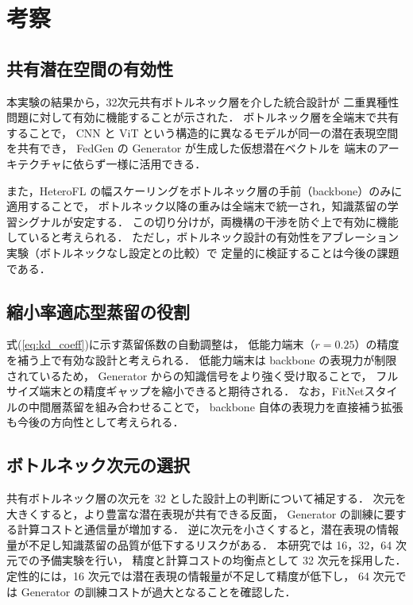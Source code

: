 \section{考察}

\subsection{共有潜在空間の有効性}

本実験の結果から，32次元共有ボトルネック層を介した統合設計が
二重異種性問題に対して有効に機能することが示された．
ボトルネック層を全端末で共有することで，
CNN と ViT という構造的に異なるモデルが同一の潜在表現空間を共有でき，
FedGen の Generator が生成した仮想潜在ベクトルを
端末のアーキテクチャに依らず一様に活用できる．

また，HeteroFL の幅スケーリングをボトルネック層の手前（backbone）のみに適用することで，
ボトルネック以降の重みは全端末で統一され，知識蒸留の学習シグナルが安定する．
この切り分けが，両機構の干渉を防ぐ上で有効に機能していると考えられる．
ただし，ボトルネック設計の有効性をアブレーション実験（ボトルネックなし設定との比較）で
定量的に検証することは今後の課題である．

\subsection{縮小率適応型蒸留の役割}

式(\ref{eq:kd_coeff})に示す蒸留係数の自動調整は，
低能力端末（$r = 0.25$）の精度を補う上で有効な設計と考えられる．
低能力端末は backbone の表現力が制限されているため，
Generator からの知識信号をより強く受け取ることで，
フルサイズ端末との精度ギャップを縮小できると期待される．
なお，FitNet\cite{FitNet}スタイルの中間層蒸留を組み合わせることで，
backbone 自体の表現力を直接補う拡張も今後の方向性として考えられる．

\subsection{ボトルネック次元の選択}

共有ボトルネック層の次元を 32 とした設計上の判断について補足する．
次元を大きくすると，より豊富な潜在表現が共有できる反面，
Generator の訓練に要する計算コストと通信量が増加する．
逆に次元を小さくすると，潜在表現の情報量が不足し知識蒸留の品質が低下するリスクがある．
本研究では 16，32，64 次元での予備実験を行い，
精度と計算コストの均衡点として 32 次元を採用した．
定性的には，16 次元では潜在表現の情報量が不足して精度が低下し，
64 次元では Generator の訓練コストが過大となることを確認した．

